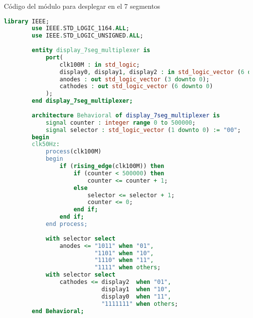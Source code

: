 \documentclass[a4paper, 12pt]{article}
\begin{document}
    Código del módulo para desplegar en el 7 segmentos
    \begin{lstlisting}[language=VHDL]
        library IEEE;
        use IEEE.STD_LOGIC_1164.ALL;
        use IEEE.STD_LOGIC_UNSIGNED.ALL;
        
        entity display_7seg_multiplexer is
            port(
                clk100M : in std_logic;
                display0, display1, display2 : in std_logic_vector (6 downto 0);
                anodes : out std_logic_vector (3 downto 0);
                cathodes : out std_logic_vector (6 downto 0)
            );
        end display_7seg_multiplexer;
        
        architecture Behavioral of display_7seg_multiplexer is
            signal counter : integer range 0 to 500000;
            signal selector : std_logic_vector (1 downto 0) := "00";
        begin
        clk50Hz:
            process(clk100M)
            begin
                if (rising_edge(clk100M)) then
                    if (counter < 500000) then
                        counter <= counter + 1;
                    else
                        selector <= selector + 1;
                        counter <= 0;
                    end if;
                end if;
            end process;
            
            with selector select
                anodes <= "1011" when "01",
                          "1101" when "10",
                          "1110" when "11",
                          "1111" when others;
            with selector select
                cathodes <= display2  when "01",
                            display1  when "10",
                            display0  when "11",
                            "1111111" when others; 
        end Behavioral;        
    \end{lstlisting}
\end{document}
